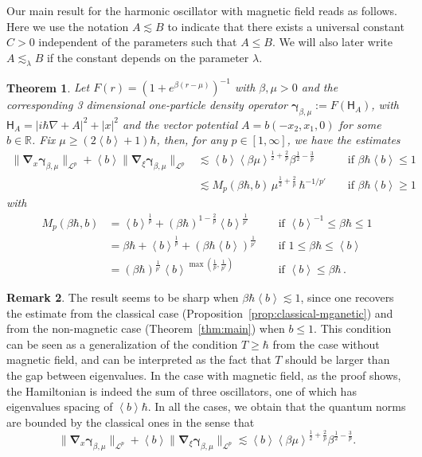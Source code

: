 \documentclass[11pt]{amsart}
\theoremstyle{plain}
\newtheorem{theorem}{Theorem}[section]
\theoremstyle{definition}
\newtheorem{remark}[theorem]{Remark}
\newcommand		{\RR}		{\mathbb R}			%
\newcommand		{\R}		{\RR}
\renewcommand	{\L}		{\mathcal L}		%
\newcommand		\sfH		{\mathsf H}			%
\newcommand		{\lt}			{\left}				%
\newcommand		{\rt}			{\right}			%
\renewcommand	{\(}			{\lt(}
\renewcommand	{\)}			{\rt)}
\newcommand		{\bangle}[1]	{\lt\langle #1\rt\rangle}
\newcommand		{\weight}[1]	{\bangle{#1}}	%
\newcommand		{\n}[1]			{\lt\lvert #1 \rt\rvert}
\newcommand		{\bnrm}[1]		{\big\lVert #1\big\rVert}	%
\newcommand		{\bNrm}[2]		{\bnrm{#1}_{#2}}
\newcommand			{\grad}		{\nabla}
\newcommand		{\opgam}	{{\boldsymbol{\gamma}}}	%
\newcommand		{\Dh}		{\boldsymbol{\nabla}}	%
\newcommand		{\Dhx}[1]	{\Dh_{\!x} #1}			%
\newcommand		{\Dhv}[1]	{\Dh_{\!\xi} #1}		%
\begin{document}
    Our main result for the harmonic oscillator with magnetic field reads as follows. Here we use the notation $A\lesssim B$ to indicate that there exists a universal constant $C>0$ independent of the parameters such that $A \leq B$. We will also later write $A \lesssim_\lambda B$ if the constant depends on the parameter $\lambda$.
    \begin{theorem}\label{thm:main-magnetic}
        Let $F(r) = (1+e^{\beta(r-\mu)})^{-1}$ with $\beta,\mu> 0$ and the corresponding 3 dimensional one-particle density operator $\opgam_{\beta, \mu} := F(\sfH_A)$, with $\sfH_A=\n{i\hbar\grad+A}^2+\n{x}^2$ and the vector potential $A = b \lt(-x_2, x_1, 0\rt)$ for some $b\in\R$. Fix $\mu \geq \lt(2\weight{b}+1\rt)\hbar$, then, for any $p\in [1,\infty]$, we have the estimates
		\begin{align*}
            \bNrm{\Dhx\opgam_{\beta,\mu}}{\L^p} + \weight{b} \bNrm{\Dhv\opgam_{\beta,\mu}}{\L^p} &\lesssim \weight{b} \weight{\beta\mu}^{\frac{1}{2}+\frac{2}{p}} \beta^{\frac{1}{2}-\frac{3}{p}} && \text{ if } \beta\hbar\weight{b} \leq 1
            \\
            &\lesssim M_p(\beta\hbar,b) \, \mu^{\frac{1}{2}+\frac{2}{p}} \, \hbar^{-1/p'} && \text{ if } \beta\hbar\weight{b} \geq 1
		\end{align*}
        with
        \begin{align*}
            M_p(\beta\hbar,b) &= \weight{b}^\frac{1}{p} + (\beta\hbar)^{1-\frac{2}{p}} \weight{b}^\frac{1}{p'}  && \text{ if } \weight{b}^{-1} \leq \beta\hbar \leq 1
            \\
             &= \beta\hbar + \weight{b}^\frac{1}{p} + (\beta\hbar\weight{b})^\frac{1}{p'} && \text{ if } 1 \leq \beta\hbar \leq \weight{b}
            \\
             &= \lt(\beta\hbar\rt)^\frac{1}{p'} \weight{b}^{\max(\frac{1}{p},\frac{1}{p'})} && \text{ if } \weight{b} \leq \beta\hbar \, .
		\end{align*}
    \end{theorem}
    
    \begin{remark}
        The result seems to be sharp when $\beta \hbar \weight{b} \lesssim 1$, since one recovers the estimate from the classical case (Proposition~\ref{prop:classical-mganetic}) and from the non-magnetic case (Theorem~\ref{thm:main}) when $b\leq 1$. This condition can be seen as a generalization of the condition $T\geq \hbar$ from the case without magnetic field, and can be interpreted as the fact that $T$ should be larger than the gap between eigenvalues. In the case with magnetic field, as the proof shows, the Hamiltonian is indeed the sum of three oscillators, one of which has eigenvalues spacing of $\weight{b}\hbar$. In all the cases, we obtain that the quantum norms are bounded by the classical ones in the sense that
        \begin{equation*}
            \bNrm{\Dhx\opgam_{\beta,\mu}}{\L^p} + \weight{b} \bNrm{\Dhv\opgam_{\beta,\mu}}{\L^p} \lesssim \weight{b} \weight{\beta\mu}^{\frac{1}{2}+\frac{2}{p}} \beta^{\frac{1}{2}-\frac{3}{p}} .
        \end{equation*}
    \end{remark}
\end{document}
